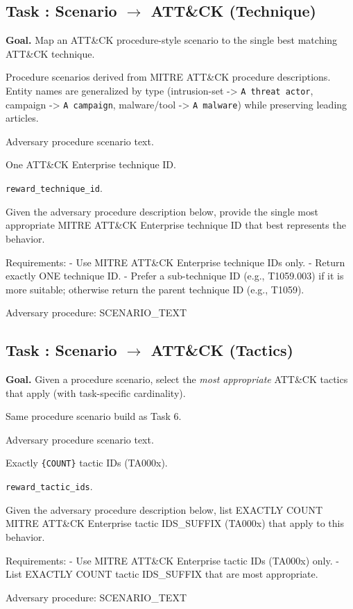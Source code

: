 \documentclass[11pt]{article}
\newcounter{task}
\newcommand{\tasksection}[1]{%
  \refstepcounter{task}%
  \subsection*{Task \thetask: #1}%
}
\newenvironment{taskmeta}{%
  \begin{description}[
      style=nextline,
      leftmargin=3.0cm,
      labelwidth=2.7cm,
      itemsep=0.15em,
      topsep=0.25em
  ]%
}{\end{description}}
\begin{document}

\tasksection{Scenario $\rightarrow$ ATT\&CK (Technique)}
\textbf{Goal.} Map an ATT\&CK procedure-style scenario to the single best matching ATT\&CK technique.
\begin{taskmeta}
  \item[Source] Procedure scenarios derived from MITRE ATT\&CK procedure descriptions. Entity names are generalized by type (intrusion-set -> \texttt{A threat actor}, campaign -> \texttt{A campaign}, malware/tool -> \texttt{A malware}) while preserving leading articles.
  \item[Input] Adversary procedure scenario text.
  \item[Output] One ATT\&CK Enterprise technique ID.
  \item[Reward] \texttt{reward\_technique\_id}.
\end{taskmeta}
\begin{promptbox}
Given the adversary procedure description below, provide the single most appropriate MITRE ATT&CK Enterprise technique ID that best represents the behavior.

Requirements:
- Use MITRE ATT&CK Enterprise technique IDs only.
- Return exactly ONE technique ID.
- Prefer a sub-technique ID (e.g., T1059.003) if it is more suitable; otherwise return the parent technique ID (e.g., T1059).

Adversary procedure:
{SCENARIO_TEXT}
\end{promptbox}

\tasksection{Scenario $\rightarrow$ ATT\&CK (Tactics)}
\textbf{Goal.} Given a procedure scenario, select the \emph{most appropriate} ATT\&CK tactics that apply (with task-specific cardinality).
\begin{taskmeta}
  \item[Source] Same procedure scenario build as Task 6.
  \item[Input] Adversary procedure scenario text.
  \item[Output] Exactly \texttt{\{COUNT\}} tactic IDs (TA000x).
  \item[Reward] \texttt{reward\_tactic\_ids}.
\end{taskmeta}
\begin{promptbox}
Given the adversary procedure description below, list EXACTLY {COUNT} MITRE ATT&CK Enterprise tactic ID{S_SUFFIX} (TA000x) that apply to this behavior.

Requirements:
- Use MITRE ATT&CK Enterprise tactic IDs (TA000x) only.
- List EXACTLY {COUNT} tactic ID{S_SUFFIX} that are most appropriate.

Adversary procedure:
{SCENARIO_TEXT}
\end{promptbox}
\end{document}
